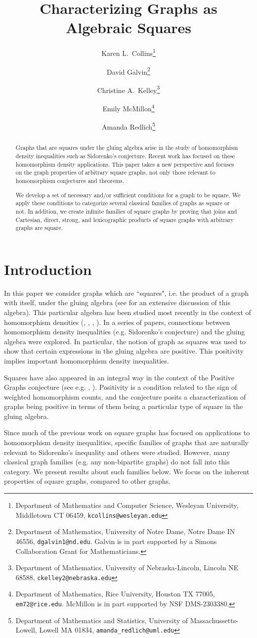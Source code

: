 \documentclass{article}
\title{Characterizing Graphs as Algebraic Squares}
\author{
Karen L.\ Collins\thanks{Department of Mathematics and Computer Science, Wesleyan University, Middletown CT 06459, 
{\tt kcollins@wesleyan.edu}}
\and
David Galvin\thanks{Department of Mathematics, University of Notre Dame, Notre Dame IN 46556, {\tt dgalvin1@nd.edu}. Galvin is in part supported by a Simons Collaboration Grant for Mathematicians.}
\and
Christine A.\ Kelley\thanks{Department of Mathematics, University of Nebraska-Lincoln, Lincoln NE 68588, 
{\tt ckelley2@nebraska.edu}}
\and
Emily McMillon\thanks{Department of Mathematics, Rice University, Houston TX 77005, {\tt em72@rice.edu}. McMillon is in part supported by NSF DMS-2303380.}
\and
Amanda Redlich\thanks{Department of Mathematics and Statistics, University of Massachussetts-Lowell, Lowell MA 01834, {\tt amanda\_redlich@uml.edu}}
}
\theoremstyle{definition}
\begin{document}
\maketitle

\begin{abstract}

Graphs that are squares under the gluing algebra arise in the study of homomorphism density inequalities such as Sidorenko's conjecture.  Recent work has focused on these homomorphism density applications.  This paper takes a new perspective and focuses on the graph properties of arbitrary square graphs, not only those relevant to homomorphism conjectures and theorems. 

We develop a set of necessary and/or sufficient conditions for a graph to be square.  We apply these conditions to categorize several classical families of graphs as square or not. In addition, we  create infinite families of square graphs by proving that joins and Cartesian, direct, strong, and lexicographic products of  square graphs with arbitrary graphs are square.
\end{abstract}


\section{Introduction} \label{sec:intro}


In this paper we consider graphs which are ``squares", i.e. the product of a graph with itself, under the gluing algebra (see \cite{limits} for an extensive discussion of this algebra).  This particular algebra has been studied most recently in the context of homomorphism densities (\cite{tropical}, \cite{path}, \cite{BRST20}, \cite {AAP}).  In a series of papers, connections between homomorphism density inequalities (e.g. Sidorenko's conjecture) and the gluing algebra were explored. In particular, the notion of graph as squares was used to show that certain expressions in the gluing algebra are positive. This positivity implies important homomorphism density inequalities. 

Squares have also appeared in an integral way in the context of the Positive Graphs conjecture (see e.g. \cite{ANTOLINCAMARENA2016290}, \cite{CLV2024}). Positivity is a condition related to the sign of weighted homomorphism counts, and the conjecture posits a characterization of graphs being positive in terms of them being a particular type of square in the gluing algebra. 


Since much of the previous work on square graphs has focused on applications to homomorphism density inequalities, specific families of graphs that are naturally relevant to Sidorenko's inequality and others were studied. However, many classical graph families (e.g. any non-bipartite graphs) do not fall into this category.  We present results about such families below. We focus on the inherent properties of square graphs, compared to other graphs.
\end{document}
